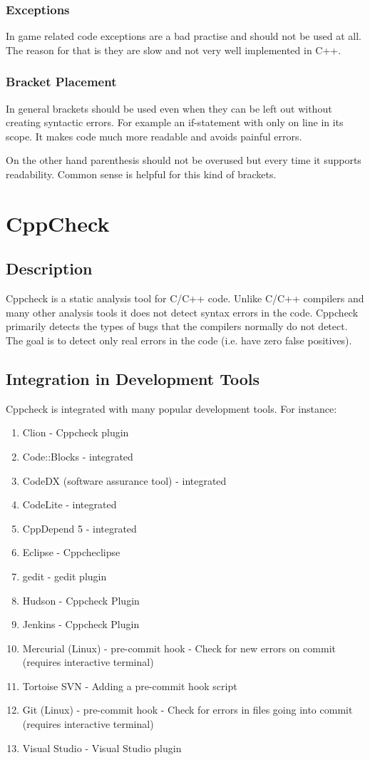\subsubsection{Exceptions}
In game related code exceptions are a bad practise and should not be used at all. The reason for that is they are slow and not very well implemented in C++.

\subsubsection{Bracket Placement}
In general brackets should be used even when they can be left out without creating syntactic errors. For example an if-statement with only on line in its scope. It makes code much more readable and avoids painful errors.

On the other hand parenthesis should not be overused but every time it supports readability. Common sense is helpful for this kind of brackets.

\section{CppCheck}
\subsection{Description}
Cppcheck is a static analysis tool for C/C++ code. Unlike C/C++ compilers and many other analysis tools it does not detect syntax errors in the code. Cppcheck primarily detects the types of bugs that the compilers normally do not detect. The goal is to detect only real errors in the code (i.e. have zero false positives).

\subsection{Integration in Development Tools}
Cppcheck is integrated with many popular development tools. For instance:
\begin{enumerate}
\item Clion - Cppcheck plugin
\item Code::Blocks - integrated
\item CodeDX (software assurance tool) - integrated
\item CodeLite - integrated
\item CppDepend 5 - integrated
\item Eclipse - Cppcheclipse
\item gedit - gedit plugin
\item Hudson - Cppcheck Plugin
\item Jenkins - Cppcheck Plugin
\item Mercurial (Linux) - pre-commit hook - Check for new errors on commit (requires interactive terminal)
\item Tortoise SVN - Adding a pre-commit hook script
\item Git (Linux) - pre-commit hook - Check for errors in files going into commit (requires interactive terminal)
\item Visual Studio - Visual Studio plugin
\end{enumerate}

